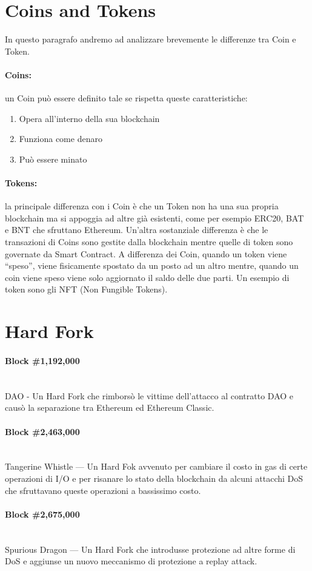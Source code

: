 \section{Coins and Tokens}
In questo paragrafo andremo ad analizzare brevemente le differenze tra Coin e Token.

\paragraph{Coins:} un Coin può essere definito tale se rispetta queste caratteristiche:

\begin{enumerate}
      \item Opera all'interno della sua blockchain
      \item Funziona come denaro
      \item Può essere minato
\end{enumerate}

\paragraph{Tokens:}
la principale differenza con i Coin è che un Token non ha una sua propria blockchain ma si appoggia ad altre già esistenti, come per esempio ERC20, BAT e BNT che sfruttano Ethereum. Un'altra sostanziale differenza è che le transazioni di Coins sono gestite dalla blockchain mentre quelle di token sono governate da Smart Contract.
A differenza dei Coin, quando un token viene ``speso'', viene fisicamente spostato da un posto ad un altro mentre, quando un coin viene speso viene solo aggiornato il saldo delle due parti. Un esempio di token sono gli NFT (Non Fungible Tokens).

\section{Hard Fork}

\paragraph{Block \#1,192,000} \ \\
DAO - Un Hard Fork che rimborsò le vittime dell'attacco al contratto DAO e causò
la separazione tra Ethereum ed Ethereum Classic.

\paragraph{Block \#2,463,000} \ \\
Tangerine Whistle — Un Hard Fok avvenuto per cambiare il costo in gas di certe
operazioni di I/O e per risanare lo stato della blockchain da alcuni attacchi
DoS che sfruttavano queste operazioni a bassissimo costo.

\paragraph{Block \#2,675,000} \ \\
Spurious Dragon — Un Hard Fork che introdusse protezione ad altre forme di DoS
e aggiunse un nuovo meccanismo di protezione a replay attack.